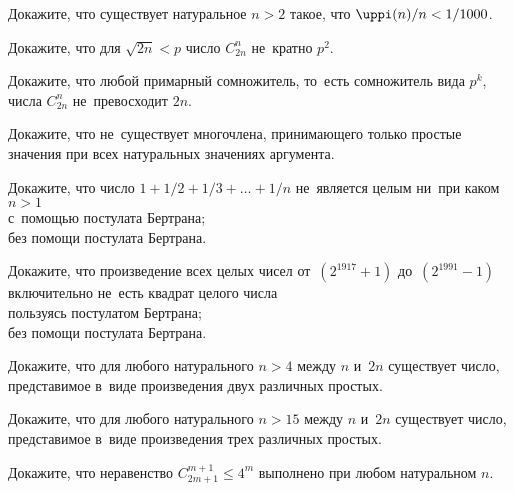 \begin{problems}

\item
Докажите, что существует натуральное $n > 2$ такое, что
$\pifunc(n) / n < 1 / 1000$.

\item
Докажите, что для $\sqrt{2n} < p$ число $C_{2n}^n$ не~кратно $p^2$.

\item
Докажите, что любой примарный сомножитель, то~есть сомножитель вида $p^{k}$, 
числа $C_{2n}^{n}$ не~превосходит $2 n$.

\item
Докажите, что не~существует многочлена, принимающего только простые значения
при всех натуральных значениях аргумента.

\item
Докажите, что число $1 + 1 / 2 + 1 / 3 + \ldots + 1 / n$ не~является целым
ни~при каком $n > 1$
\\
\subproblem с~помощью постулата Бертрана; 
\\
\subproblem без помощи постулата Бертрана.

\item
Докажите, что произведение всех целых чисел от~$(2^{1917} + 1)$
до~$(2^{1991} - 1)$ включительно не~есть квадрат целого числа
\\
\subproblem пользуясь постулатом Бертрана;
\\
\subproblem без помощи постулата Бертрана.

\item
Докажите, что для любого натурального $n > 4$ между $n$ и~$2 n$ существует
число, представимое в~виде произведения двух различных простых.

\item
Докажите, что для любого натурального $n > 15$ между $n$ и~$ 2n$ существует
число, представимое в~виде произведения трех различных простых.

\item
Докажите, что неравенство $C_{2m+1}^{m+1} \leq 4^{m}$ выполнено при любом
натуральном $n$.

\end{problems}

\endgroup %


